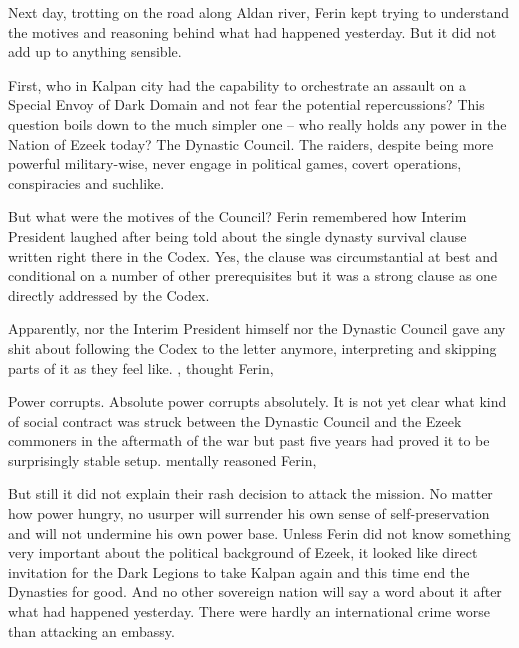 Next day, trotting on the road along Aldan river, Ferin kept trying to understand the motives and reasoning behind what had happened yesterday. But it did not add up to anything sensible.

First, who in Kalpan city had the capability to orchestrate an assault on a Special Envoy of Dark Domain and not fear the potential repercussions? This question boils down to the much simpler one -- who really holds any power in the Nation of Ezeek today? The Dynastic Council. The raiders, despite being more powerful military-wise, never engage in political games, covert operations, conspiracies and suchlike.

But what were the motives of the Council? Ferin remembered how Interim President laughed after being told about the single dynasty survival clause written right there in the Codex. Yes, the clause was circumstantial at best and conditional on a number of other prerequisites but it was a strong clause as one directly addressed by the Codex.

Apparently, nor the Interim President himself nor the Dynastic Council gave any shit about following the Codex to the letter anymore, interpreting and skipping parts of it as they feel like. , thought Ferin, 

Power corrupts. Absolute power corrupts absolutely. It is not yet clear what kind of social contract was struck between the Dynastic Council and the Ezeek commoners in the aftermath of the war but past five years had proved it to be surprisingly stable setup.  mentally reasoned Ferin, 

But still it did not explain their rash decision to attack the mission. No matter how power hungry, no usurper will surrender his own sense of self-preservation and will not undermine his own power base. Unless Ferin did not know something very important about the political background of Ezeek, it looked like direct invitation for the Dark Legions to take Kalpan again and this time end the Dynasties for good. And no other sovereign nation will say a word about it after what had happened yesterday. There were hardly an international crime worse than attacking an embassy.

